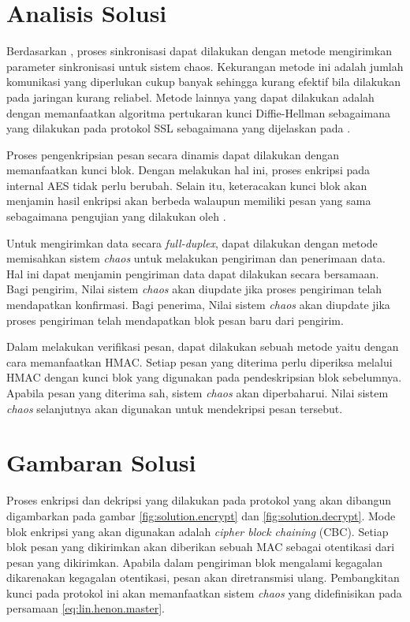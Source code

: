 \section{Analisis Solusi} 

Berdasarkan \textcite{lin2021}, proses sinkronisasi dapat dilakukan dengan metode mengirimkan parameter sinkronisasi untuk sistem chaos. Kekurangan metode ini adalah jumlah komunikasi yang diperlukan cukup banyak sehingga kurang efektif bila dilakukan pada jaringan kurang reliabel. Metode lainnya yang dapat dilakukan adalah dengan memanfaatkan algoritma pertukaran kunci Diffie-Hellman sebagaimana yang dilakukan pada protokol SSL sebagaimana yang dijelaskan pada \textcite{munir2019}.

Proses pengenkripsian pesan secara dinamis dapat dilakukan dengan memanfaatkan kunci blok. Dengan melakukan hal ini, proses enkripsi pada internal AES tidak perlu berubah. Selain itu, keteracakan kunci blok akan menjamin hasil enkripsi akan berbeda walaupun memiliki pesan yang sama sebagaimana pengujian yang dilakukan oleh \textcite{lin2021}.

Untuk mengirimkan data secara \emph{full-duplex}, dapat dilakukan dengan metode memisahkan sistem \emph{chaos} untuk melakukan pengiriman dan penerimaan data. Hal ini dapat menjamin pengiriman data dapat dilakukan secara bersamaan. Bagi pengirim, Nilai sistem \emph{chaos} akan diupdate jika proses pengiriman telah mendapatkan konfirmasi. Bagi penerima, Nilai sistem \emph{chaos} akan diupdate jika proses pengiriman telah mendapatkan blok pesan baru dari pengirim.

Dalam melakukan verifikasi pesan, dapat dilakukan sebuah metode yaitu dengan cara memanfaatkan HMAC. Setiap pesan yang diterima perlu diperiksa melalui HMAC dengan kunci blok yang digunakan pada pendeskripsian blok sebelumnya. Apabila pesan yang diterima sah, sistem \emph{chaos} akan diperbaharui. Nilai sistem \emph{chaos} selanjutnya akan digunakan untuk mendekripsi pesan tersebut.

\section{Gambaran Solusi}

Proses enkripsi dan dekripsi yang dilakukan pada protokol yang akan dibangun digambarkan pada gambar \ref{fig:solution.encrypt} dan \ref{fig:solution.decrypt}. Mode blok enkripsi yang akan digunakan adalah \emph{cipher block chaining} (CBC). Setiap blok pesan yang dikirimkan akan diberikan sebuah MAC sebagai otentikasi dari pesan yang dikirimkan. Apabila dalam pengiriman blok mengalami kegagalan dikarenakan kegagalan otentikasi, pesan akan diretransmisi ulang. Pembangkitan kunci pada protokol ini akan memanfaatkan sistem \emph{chaos} yang didefinisikan pada persamaan \ref{eq:lin.henon.master}.

